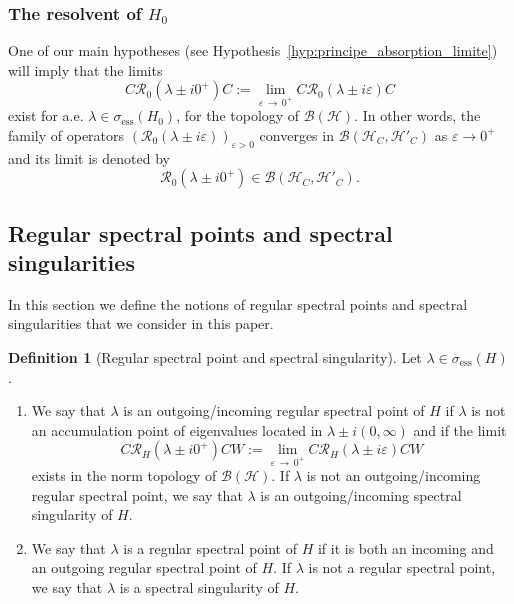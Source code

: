 \documentclass[10pt]{amsart}
\theoremstyle{definition}\newtheorem{defi}[theo]{Definition}\newtheorem{rema}[theo]{Remark}\newtheorem{exam}[theo]{Example}\newtheorem{exem}[theo]{Example}\newtheorem{nota}[theo]{Notation}
\newcommand{\Hi}{\mathcal{H}}
\newcommand{\ess}{\mathrm{ess}}
\newcommand{\Res}{\mathcal{R}}
\newcommand{\clB}{\mathcal{B}}
\newcommand*{\romanenumi}{\renewcommand*{\theenumi}{\roman{enumi}}}
\begin{document}
\subsubsection{The resolvent of \texorpdfstring{$H_0$}{H0}}
One of our main hypotheses (see Hypothesis~\ref{hyp:principe_absorption_limite}) will imply that the limits
\begin{equation}\label{eq:limit_abs_H0}
C\Res_0(\lambda\pm i0^+)C:=\lim_{\varepsilon\,\rightarrow\,0^+}C\Res_0(\lambda\pm i\varepsilon)C
\end{equation}
exist for a.e. $\lambda\in\sigma_{\ess}(H_0)$, for the topology of $\clB(\Hi)$. In other words, the family of operators $(\Res_0(\lambda\pm i\varepsilon))_{\varepsilon>0}$ converges in $\clB(\Hi_C,\Hi'_C)$ as $\varepsilon\to0^+$ and its limit is denoted by
\begin{equation*}
\Res_0\left(\lambda\pm i0^+\right)\in\clB(\Hi_C,\Hi'_C).
\end{equation*}

\subsection{Regular spectral points and spectral singularities}

In this section we define the notions of regular spectral points and spectral singularities that we consider in this paper.

\begin{defi}[Regular spectral point and spectral singularity]\label{def:point_spectral_regulier_classique_pour_H}
Let $\lambda\in\sigma_\ess(H)$.
\begin{enumerate}\romanenumi
\item\label{defi2.2.1} We say that $\lambda$ is an outgoing/incoming regular spectral point of $H$ if $\lambda$ is not an accumulation point of eigenvalues located in $\lambda\pm i(0,\infty)$ and if the limit
\begin{equation}\label{eq:def_reg_spec_pt}
C\Res_H(\lambda\pm i0^+)CW:=\lim_{\varepsilon\,\rightarrow\,0^+} C\Res_H(\lambda\pm i\varepsilon)CW
\end{equation}
exists in the norm topology of $\clB(\Hi)$. If $\lambda$ is not an outgoing/incoming regular spectral point, we say that $\lambda$ is an outgoing/incoming spectral singularity of $H$.
\item \label{defi2.2.2}We say that $\lambda$ is a regular spectral point of $H$ if it is both an incoming and an outgoing regular spectral point of $H$. If $\lambda$ is not a regular spectral point, we say that $\lambda$ is a spectral singularity of $H$.
\end{enumerate}
\end{defi}
\end{document}
